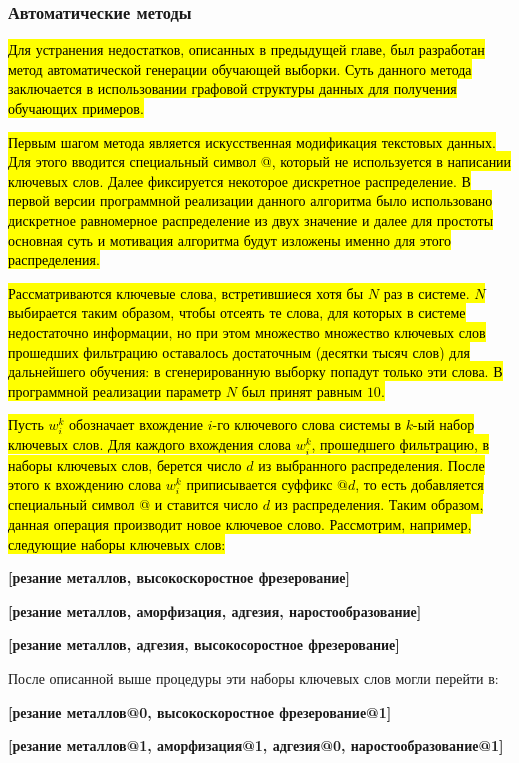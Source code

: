 \subsubsection{Автоматические методы}
\hl{Для устранения недостатков, описанных в предыдущей главе, был разработан метод автоматической генерации обучающей выборки. Суть данного метода заключается в использовании графовой структуры данных для получения обучающих примеров.}

\hl{Первым шагом метода является искусственная модификация текстовых данных. Для этого вводится специальный символ @, который не используется в написании ключевых слов. Далее фиксируется некоторое дискретное распределение. В первой версии программной реализации данного алгоритма было использовано дискретное равномерное распределение из двух значение и далее для простоты основная суть и мотивация алгоритма будут изложены именно для этого распределения.}

\hl{Рассматриваются ключевые слова, встретившиеся хотя бы $N$ раз в системе. $N$ выбирается таким образом, чтобы отсеять те слова, для которых в системе недостаточно информации, но при этом множество множество  ключевых слов прошедших фильтрацию оставалось достаточным (десятки тысяч слов) для дальнейшего обучения: в сгенерированную выборку попадут только эти слова. В программной реализации параметр $N$ был принят равным $10$. }

\hl{Пусть $w_i^k$ обозначает вхождение $i$-го ключевого слова системы в $k$-ый набор ключевых слов. Для каждого вхождения слова $w_i^k$, прошедшего фильтрацию, в наборы ключевых слов, берется число $d$ из выбранного распределения. После этого к вхождению слова $w_i^k$ приписывается суффикс $@d$, то есть добавляется специальный символ @ и ставится число $d$ из распределения. Таким образом, данная операция производит новое ключевое слово. Рассмотрим, например, следующие наборы ключевых слов:}

\textbf{[резание металлов, высокоскоростное фрезерование]}\

\textbf{[резание металлов, аморфизация, адгезия, наростообразование]}\

\textbf{[резание металлов, адгезия, высокосоростное фрезерование]}\

После описанной выше процедуры эти наборы ключевых слов могли перейти в:

\textbf{[резание металлов@0, высокоскоростное фрезерование@1]}\

\textbf{[резание металлов@1, аморфизация@1, адгезия@0, наростообразование@1]}\

